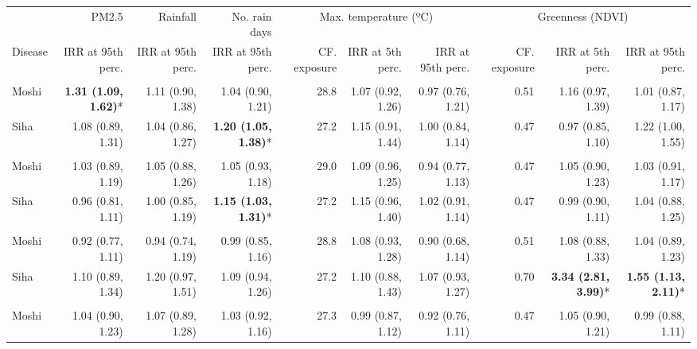 \begin{table}[t]
\fontsize{12.0pt}{14.4pt}\selectfont
\begin{tabular*}{\linewidth}{@{\extracolsep{\fill}}l|rrrrrrrrr}
\toprule
 & PM2.5 & Rainfall & No. rain days & \multicolumn{3}{c}{Max. temperature (ºC)} & \multicolumn{3}{c}{Greenness (NDVI)} \\ 
\cmidrule(lr){2-2} \cmidrule(lr){3-3} \cmidrule(lr){4-4} \cmidrule(lr){5-7} \cmidrule(lr){8-10}
Disease & IRR at 95th perc. & IRR at 95th perc. & IRR at 95th perc. & CF. exposure & IRR at 5th perc. & IRR at 95th perc. & CF. exposure & IRR at 5th perc. & IRR at 95th perc. \\ 
\midrule\addlinespace[2.5pt]
\multicolumn{10}{l}{Chronic Respiratory Disease} \\[2.5pt] 
\midrule\addlinespace[2.5pt]
Moshi & \textbf{1.31 (1.09, 1.62)}* & 1.11 (0.90, 1.38) & 1.04 (0.90, 1.21) & 28.8 & 1.07 (0.92, 1.26) & 0.97 (0.76, 1.21) & 0.51 & 1.16 (0.97, 1.39) & 1.01 (0.87, 1.17) \\ 
Siha & 1.08 (0.89, 1.31) & 1.04 (0.86, 1.27) & \textbf{1.20 (1.05, 1.38)}* & 27.2 & 1.15 (0.91, 1.44) & 1.00 (0.84, 1.14) & 0.47 & 0.97 (0.85, 1.10) & 1.22 (1.00, 1.55) \\ 
\midrule\addlinespace[2.5pt]
\multicolumn{10}{l}{Hypertension} \\[2.5pt] 
\midrule\addlinespace[2.5pt]
Moshi & 1.03 (0.89, 1.19) & 1.05 (0.88, 1.26) & 1.05 (0.93, 1.18) & 29.0 & 1.09 (0.96, 1.25) & 0.94 (0.77, 1.13) & 0.47 & 1.05 (0.90, 1.23) & 1.03 (0.91, 1.17) \\ 
Siha & 0.96 (0.81, 1.11) & 1.00 (0.85, 1.19) & \textbf{1.15 (1.03, 1.31)}* & 27.2 & 1.15 (0.96, 1.40) & 1.02 (0.91, 1.14) & 0.47 & 0.99 (0.90, 1.11) & 1.04 (0.88, 1.25) \\ 
\midrule\addlinespace[2.5pt]
\multicolumn{10}{l}{Diabetes Mellitus} \\[2.5pt] 
\midrule\addlinespace[2.5pt]
Moshi & 0.92 (0.77, 1.11) & 0.94 (0.74, 1.19) & 0.99 (0.85, 1.16) & 28.8 & 1.08 (0.93, 1.28) & 0.90 (0.68, 1.14) & 0.51 & 1.08 (0.88, 1.33) & 1.04 (0.89, 1.23) \\ 
Siha & 1.10 (0.89, 1.34) & 1.20 (0.97, 1.51) & 1.09 (0.94, 1.26) & 27.2 & 1.10 (0.88, 1.43) & 1.07 (0.93, 1.27) & 0.70 & \textbf{3.34 (2.81, 3.99)}* & \textbf{1.55 (1.13, 2.11)}* \\ 
\midrule\addlinespace[2.5pt]
\multicolumn{10}{l}{Upper Respiratory Infections} \\[2.5pt] 
\midrule\addlinespace[2.5pt]
Moshi & 1.04 (0.90, 1.23) & 1.07 (0.89, 1.28) & 1.03 (0.92, 1.16) & 27.3 & 0.99 (0.87, 1.12) & 0.92 (0.76, 1.11) & 0.47 & 1.05 (0.90, 1.21) & 0.99 (0.88, 1.11) \\ 

\end{tabular*}
\end{table}
